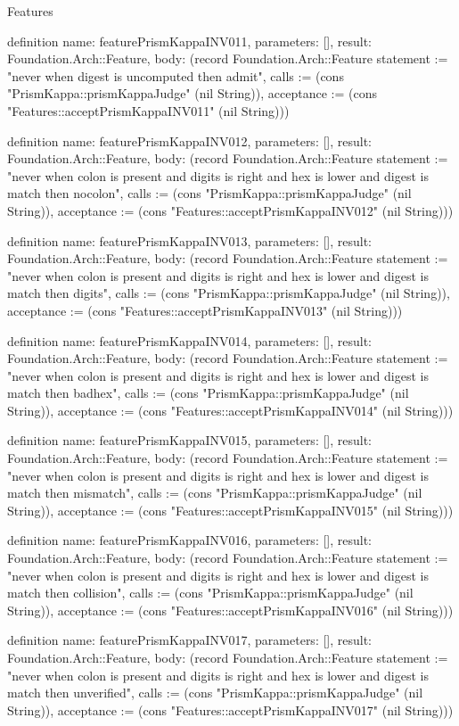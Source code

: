 \begin{lexlean}{Features}
\begin{semanticmodule}
definition{
  name: featurePrismKappaINV011,
  parameters: [],
  result: Foundation.Arch::Feature,
  body: (record Foundation.Arch::Feature {statement := "never when digest is uncomputed then admit", calls := (cons "PrismKappa::prismKappaJudge" (nil String)), acceptance := (cons "Features::acceptPrismKappaINV011" (nil String))})
}

definition{
  name: featurePrismKappaINV012,
  parameters: [],
  result: Foundation.Arch::Feature,
  body: (record Foundation.Arch::Feature {statement := "never when colon is present and digits is right and hex is lower and digest is match then nocolon", calls := (cons "PrismKappa::prismKappaJudge" (nil String)), acceptance := (cons "Features::acceptPrismKappaINV012" (nil String))})
}

definition{
  name: featurePrismKappaINV013,
  parameters: [],
  result: Foundation.Arch::Feature,
  body: (record Foundation.Arch::Feature {statement := "never when colon is present and digits is right and hex is lower and digest is match then digits", calls := (cons "PrismKappa::prismKappaJudge" (nil String)), acceptance := (cons "Features::acceptPrismKappaINV013" (nil String))})
}

definition{
  name: featurePrismKappaINV014,
  parameters: [],
  result: Foundation.Arch::Feature,
  body: (record Foundation.Arch::Feature {statement := "never when colon is present and digits is right and hex is lower and digest is match then badhex", calls := (cons "PrismKappa::prismKappaJudge" (nil String)), acceptance := (cons "Features::acceptPrismKappaINV014" (nil String))})
}

definition{
  name: featurePrismKappaINV015,
  parameters: [],
  result: Foundation.Arch::Feature,
  body: (record Foundation.Arch::Feature {statement := "never when colon is present and digits is right and hex is lower and digest is match then mismatch", calls := (cons "PrismKappa::prismKappaJudge" (nil String)), acceptance := (cons "Features::acceptPrismKappaINV015" (nil String))})
}

definition{
  name: featurePrismKappaINV016,
  parameters: [],
  result: Foundation.Arch::Feature,
  body: (record Foundation.Arch::Feature {statement := "never when colon is present and digits is right and hex is lower and digest is match then collision", calls := (cons "PrismKappa::prismKappaJudge" (nil String)), acceptance := (cons "Features::acceptPrismKappaINV016" (nil String))})
}

definition{
  name: featurePrismKappaINV017,
  parameters: [],
  result: Foundation.Arch::Feature,
  body: (record Foundation.Arch::Feature {statement := "never when colon is present and digits is right and hex is lower and digest is match then unverified", calls := (cons "PrismKappa::prismKappaJudge" (nil String)), acceptance := (cons "Features::acceptPrismKappaINV017" (nil String))})
}


\end{semanticmodule}
\end{lexlean}
